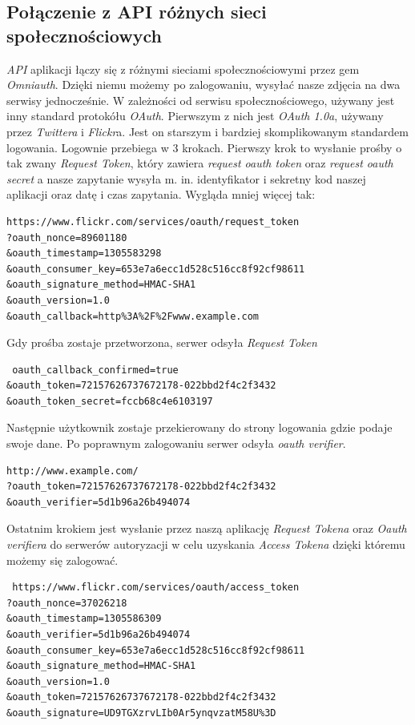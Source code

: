 \documentclass[openright]{xmgr}
\begin{document}
\subsection{Połączenie z API różnych sieci społecznościowych}
\textit{API} aplikacji łączy się z różnymi sieciami społecznościowymi przez gem \textit{Omniauth}. Dzięki niemu możemy po zalogowaniu, wysyłać nasze zdjęcia na dwa serwisy jednocześnie. W zależności od serwisu społecznościowego, używany jest inny standard protokółu \textit{OAuth}. Pierwszym z nich jest \textit{OAuth 1.0a}, używany przez \textit{Twittera} i \textit{Flickr}a. Jest on starszym i bardziej skomplikowanym standardem logowania. Logownie przebiega w 3 krokach. Pierwszy krok to wysłanie prośby o tak zwany \textit{Request Token}, który zawiera \textit{request oauth token} oraz \textit{request oauth secret} a nasze zapytanie wysyła m. in.  identyfikator i sekretny kod naszej aplikacji oraz datę i czas zapytania. Wygląda mniej więcej tak:
\begin{verbatim}
https://www.flickr.com/services/oauth/request_token
?oauth_nonce=89601180
&oauth_timestamp=1305583298
&oauth_consumer_key=653e7a6ecc1d528c516cc8f92cf98611
&oauth_signature_method=HMAC-SHA1
&oauth_version=1.0
&oauth_callback=http%3A%2F%2Fwww.example.com
\end{verbatim}
\newpage
 Gdy prośba zostaje przetworzona, serwer odsyła \textit{Request Token} 
\begin{verbatim}
 oauth_callback_confirmed=true
&oauth_token=72157626737672178-022bbd2f4c2f3432
&oauth_token_secret=fccb68c4e6103197
\end{verbatim}
Następnie użytkownik zostaje przekierowany do strony logowania gdzie podaje swoje dane. Po poprawnym zalogowaniu serwer odsyła \textit{oauth verifier}.
\begin{verbatim}
http://www.example.com/
?oauth_token=72157626737672178-022bbd2f4c2f3432
&oauth_verifier=5d1b96a26b494074
\end{verbatim}
 Ostatnim krokiem jest wysłanie przez naszą aplikację \textit{Request Tokena} oraz \textit{Oauth verifiera} do serwerów autoryzacji w celu uzyskania \textit{Access Tokena} dzięki któremu możemy się zalogować.
 \begin{verbatim}
 https://www.flickr.com/services/oauth/access_token
?oauth_nonce=37026218
&oauth_timestamp=1305586309
&oauth_verifier=5d1b96a26b494074
&oauth_consumer_key=653e7a6ecc1d528c516cc8f92cf98611
&oauth_signature_method=HMAC-SHA1
&oauth_version=1.0
&oauth_token=72157626737672178-022bbd2f4c2f3432
&oauth_signature=UD9TGXzrvLIb0Ar5ynqvzatM58U%3D
\end{verbatim}
\end{document}
